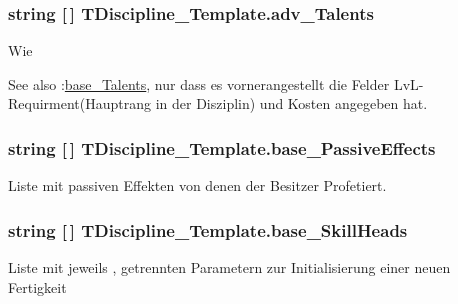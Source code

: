 \subsubsection[{adv\+\_\+\+Talents}]{\setlength{\rightskip}{0pt plus 5cm}string \mbox{[}$\,$\mbox{]} T\+Discipline\+\_\+\+Template.\+adv\+\_\+\+Talents}\label{struct_t_discipline___template_ada6372f9138e4a582b84926fcd631c93}
Wie \begin{DoxySeeAlso}{See also}
\+:\hyperlink{struct_t_discipline___template_afb9d738ec47776f7c3dfc98e2507991b}{base\+\_\+\+Talents}, nur dass es vornerangestellt die Felder Lv\+L-\/\+Requirment(Hauptrang in der Disziplin) und Kosten angegeben hat. 
\end{DoxySeeAlso}
\hypertarget{struct_t_discipline___template_afa71992d7f467f7eaa7f1f4d0dc7d05e}{}
\subsubsection[{base\+\_\+\+Passive\+Effects}]{\setlength{\rightskip}{0pt plus 5cm}string \mbox{[}$\,$\mbox{]} T\+Discipline\+\_\+\+Template.\+base\+\_\+\+Passive\+Effects}\label{struct_t_discipline___template_afa71992d7f467f7eaa7f1f4d0dc7d05e}
Liste mit passiven Effekten von denen der Besitzer Profetiert. \hypertarget{struct_t_discipline___template_aec2a4f16caf01c371224b0f67059cb74}{}
\subsubsection[{base\+\_\+\+Skill\+Heads}]{\setlength{\rightskip}{0pt plus 5cm}string \mbox{[}$\,$\mbox{]} T\+Discipline\+\_\+\+Template.\+base\+\_\+\+Skill\+Heads}\label{struct_t_discipline___template_aec2a4f16caf01c371224b0f67059cb74}
Liste mit jeweils \textquotesingle{},\textquotesingle{} getrennten Parametern zur Initialisierung einer neuen Fertigkeit \hypertarget{struct_t_discipline___template_afb9d738ec47776f7c3dfc98e2507991b}{}
